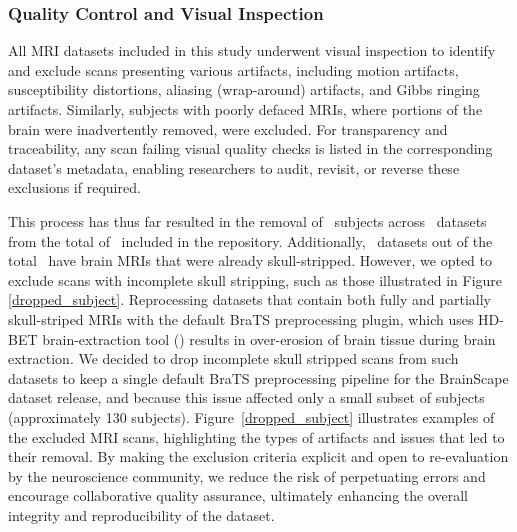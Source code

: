 \subsubsection{Quality Control and Visual Inspection}

All MRI datasets included in this study underwent visual inspection to identify and exclude scans presenting various artifacts, 
including motion artifacts, susceptibility distortions, aliasing (wrap-around) artifacts, and Gibbs ringing artifacts. 
Similarly, subjects with poorly defaced MRIs, where portions of the brain were inadvertently removed, were excluded. For transparency and 
traceability, any scan failing visual quality checks is listed in the corresponding dataset's metadata, enabling researchers to audit, 
revisit, or reverse these exclusions if required.

This process has thus far resulted in the removal of \TotalNumSubjectsRemoved\ subjects across \TotalNumDatasetsWithSubjectsRemoved\ datasets 
from the total of \NumDatasets\ included in the repository. 
Additionally, \NumDatasetsAlreadySkullStripped\ datasets out of the total \NumDatasets\ have brain MRIs that were already skull-stripped. 
However, we opted to exclude scans with incomplete skull stripping, such as those illustrated in Figure \ref{dropped_subject}. 
Reprocessing datasets that contain both fully and partially skull-striped MRIs with the default BraTS preprocessing plugin, 
which uses HD-BET brain-extraction tool (\cite{isensee2019automated}) results in over-erosion of brain tissue during brain extraction.
We decided to drop incomplete skull stripped scans from such datasets to keep a single default BraTS preprocessing pipeline for the BrainScape dataset release, 
and because this issue affected only a small subset of subjects (approximately 130 subjects).
Figure~\ref{dropped_subject} illustrates examples of the excluded MRI scans, highlighting the types of artifacts and issues that led to their removal. By making the exclusion 
criteria explicit and open to re-evaluation by the neuroscience community, we reduce the risk of perpetuating errors and encourage collaborative quality assurance, 
ultimately enhancing the overall integrity and reproducibility of the dataset.



